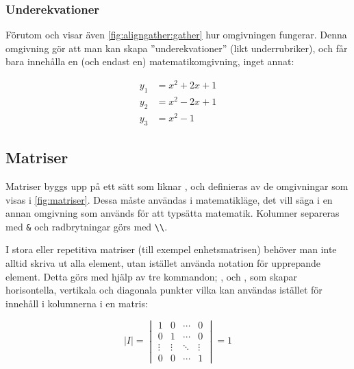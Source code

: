 \documentclass[10pt,../../a4.tex]{subfiles}
\begin{document}
\subsubsection{Underekvationer}
Förutom  och  visar även \cref{fig:aligngather:gather} hur omgivningen  fungerar. Denna
omgivning gör att man kan skapa ”underekvationer” (likt underrubriker),
och får bara innehålla en (och endast en) matematikomgivning, inget annat:
\begin{latexcode}
\begin{subequations}
\begin{align}
y_1 &= x^2 + 2x + 1 \\
y_2 &= x^2 - 2x + 1 \\
y_3 &= x^2 - 1
\end{align}
\end{subequations}
\end{latexcode}

\subsection{Matriser}
Matriser byggs upp på ett sätt som liknar , och definieras
av de omgivningar som visas i \cref{fig:matriser}. Dessa måste
användas i matematikläge, det vill säga i en annan omgivning som används
för att typsätta matematik. Kolumner separeras med \verb|&| och
radbrytningar görs med \verb|\\|.

I stora eller repetitiva matriser (till exempel enhetsmatrisen) behöver
man inte alltid skriva ut alla element, utan istället använda notation
för upprepande element. Detta görs med hjälp av tre kommandon; 
	,  och , som skapar horisontella,
	vertikala och diagonala punkter vilka kan användas istället för innehåll
i kolumnerna i en matris:\label{sec:3:matrispktr}
\begin{latexcode}
\begin{equation*}
\lvert I\rvert = \begin{vmatrix}
1      & 0      & \cdots & 0      \\
0      & 1      & \cdots & 0      \\ 
\vdots & \vdots & \ddots & \vdots \\
0      & 0      & \cdots & 1
\end{vmatrix} = 1
\end{equation*}
\end{latexcode}
\end{document}
